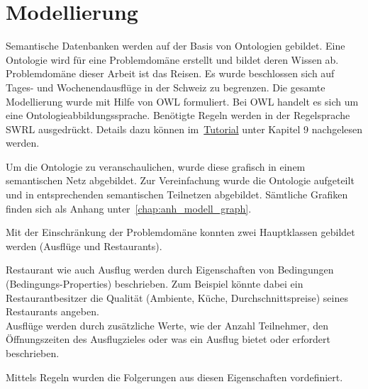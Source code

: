 \section{Modellierung}
\label{sec:loesung_modellierung}
Semantische Datenbanken werden auf der Basis von Ontologien gebildet. Eine Ontologie wird für eine Problemdomäne erstellt und bildet deren Wissen ab. Problemdomäne dieser Arbeit ist das Reisen. Es wurde beschlossen sich auf Tages- und Wochenendausflüge in der Schweiz zu begrenzen. Die gesamte Modellierung wurde mit Hilfe von OWL formuliert. Bei OWL handelt es sich um eine Ontologieabbildungssprache. Benötigte Regeln werden in der Regelsprache SWRL ausgedrückt. Details dazu können im~\hyperref[sec:anhang:tutorial_dokument]{Tutorial} unter Kapitel 9 nachgelesen werden.

Um die Ontologie zu veranschaulichen, wurde diese grafisch in einem semantischen Netz abgebildet. Zur Vereinfachung wurde die Ontologie aufgeteilt und in entsprechenden semantischen Teilnetzen abgebildet. Sämtliche Grafiken finden sich als Anhang unter~\ref{chap:anh_modell_graph}.

Mit der Einschränkung der Problemdomäne konnten zwei Hauptklassen gebildet werden (Ausflüge und Restaurants).

Restaurant wie auch Ausflug werden durch Eigenschaften von Bedingungen (Bedingungs-Properties) beschrieben. Zum Beispiel könnte dabei ein Restaurantbesitzer die Qualität (Ambiente, Küche, Durchschnittspreise) seines Restaurants angeben.\\
Ausflüge werden durch zusätzliche Werte, wie der Anzahl Teilnehmer, den Öffnungszeiten des Ausflugzieles oder was ein Ausflug bietet oder erfordert beschrieben.

Mittels Regeln wurden die Folgerungen aus diesen Eigenschaften vordefiniert.

